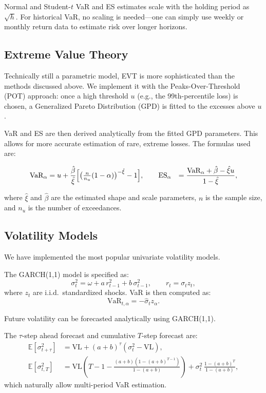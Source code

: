 \documentclass{article}
\begin{document}
Normal and Student-$t$ VaR and ES estimates scale with the holding period as $\sqrt{h}$. For historical VaR, no scaling is needed—one can simply use weekly or monthly return data to estimate risk over longer horizons.


\subsection{Extreme Value Theory}


Technically still a parametric model, EVT is more sophisticated than the methods discussed above. We implement it with the Peaks-Over-Threshold (POT) approach: once a high threshold $u$ (e.g., the 99th-percentile loss) is chosen, a Generalized Pareto Distribution (GPD) is fitted to the excesses above $u$. 

VaR and ES are then derived analytically from the fitted GPD parameters. This allows for more accurate estimation of rare, extreme losses. The formulas used are:

\[
\begin{aligned}
{\text{VaR}}_\alpha &= u + \frac{\hat{\beta}}{\hat{\xi}}
\Bigl[\bigl(\tfrac{n}{n_u}(1-\alpha)\bigr)^{-\hat{\xi}} - 1\Bigr],\qquad
{\text{ES}}_\alpha &= \frac{{\text{VaR}}_\alpha + \hat{\beta} - \hat{\xi} u}{1 - \hat{\xi}},
\end{aligned}
\]

where $\hat{\xi}$ and $\hat{\beta}$ are the estimated shape and scale parameters, $n$ is the sample size, and $n_u$ is the number of exceedances.


\subsection{Volatility Models}

We have implemented the most popular univariate volatility models.

The GARCH(1,1) model is specified as:
\[
  \sigma_t^2 = \omega + a\, r_{t-1}^2 + b\, \sigma_{t-1}^2, \qquad r_t = \sigma_t z_t,
\]
where \( z_t \) are i.i.d.\ standardized shocks. VaR is then computed as:
\[
  \text{VaR}_{t,\alpha} = -\hat{\sigma}_t z_\alpha.
\]

Future volatility can be forecasted analytically using GARCH(1,1).

The \( \tau \)-step ahead forecast and cumulative \( T \)-step forecast are:
\begin{align*}
  \mathbb{E}[\sigma_{t+\tau}^2] &= \mathrm{VL} + (a + b)^\tau(\sigma_t^2 - \mathrm{VL}),  \\  
  \mathbb{E}[\sigma_{t,T}^2] &= \mathrm{VL}\left(T - 1 - \frac{(a + b)(1 - (a + b)^{T - 1})}{1 - (a + b)}\right)
    + \sigma_t^2\, \frac{1 - (a + b)^T}{1 - (a + b)},
\end{align*}
which naturally allow multi-period VaR estimation.
\end{document}
